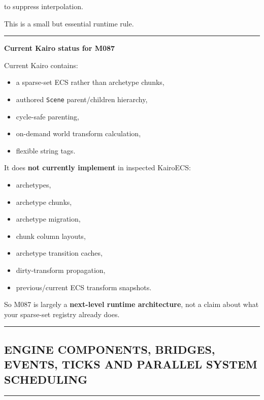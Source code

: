 to suppress interpolation.

This is a small but essential runtime rule.

\begin{center}\rule{0.5\linewidth}{0.5pt}\end{center}

\textbf{Current Kairo status for M087}

Current Kairo contains:

\begin{itemize}
\tightlist
\item
  a sparse-set ECS rather than archetype chunks,
\item
  authored \texttt{Scene} parent/children hierarchy,
\item
  cycle-safe parenting,
\item
  on-demand world transform calculation,
\item
  flexible string tags.
\end{itemize}

It does \textbf{not currently implement} in inspected KairoECS:

\begin{itemize}
\tightlist
\item
  archetypes,
\item
  archetype chunks,
\item
  archetype migration,
\item
  chunk column layouts,
\item
  archetype transition caches,
\item
  dirty-transform propagation,
\item
  previous/current ECS transform snapshots.
\end{itemize}

So M087 is largely a \textbf{next-level runtime architecture}, not a claim about what your sparse-set registry already does.

\begin{center}\rule{0.5\linewidth}{0.5pt}\end{center}

\subsection{ENGINE COMPONENTS, BRIDGES, EVENTS, TICKS AND PARALLEL SYSTEM SCHEDULING}\label{05-engine-i-ch016-engine-components-bridges-events-ticks-and-parallel-system-scheduling}

\begin{center}\rule{0.5\linewidth}{0.5pt}\end{center}

